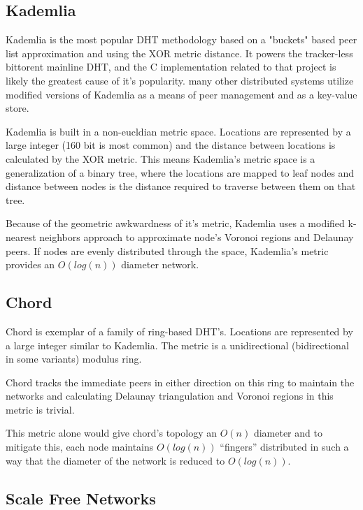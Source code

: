 \subsection{Kademlia}

Kademlia\cite{kademlia} is the most popular DHT methodology based on a "buckets" based peer list approximation and using the XOR metric distance. 
It powers the tracker-less bittorent mainline DHT, and the C implementation related to that project is likely the greatest cause of it's popularity.
many other distributed systems utilize modified versions of Kademlia as a means of peer management and as a key-value store.

Kademlia is built in a non-eucldian metric space. 
Locations are represented by a large integer (160 bit is most common) and the distance between locations is calculated by the XOR metric.
This means Kademlia's metric space is a generalization of a binary tree, where the locations are mapped to leaf nodes and distance between nodes is the distance required to traverse between them on that tree.

Because of the geometric awkwardness of it's metric, Kademlia uses a modified k-nearest neighbors approach to approximate node's Voronoi regions and Delaunay peers.
If nodes are evenly distributed through the space, Kademlia's metric provides an $O(log(n))$ diameter network.

\subsection{Chord}

Chord\cite{chord} is exemplar of a family of ring-based DHT's.
Locations are represented by a large integer similar to Kademlia.
The metric is a unidirectional (bidirectional in some variants) modulus ring.

Chord tracks the immediate peers in either direction on this ring to maintain the networks and calculating Delaunay triangulation and Voronoi regions in this metric is trivial.

This metric alone would give chord's topology an $O(n)$ diameter 
and to mitigate this, each node maintains $O(log(n))$ ``fingers''
 distributed in such a way that the diameter of the network is reduced to $O(log(n))$.
 
 
\subsection{Scale Free Networks}

